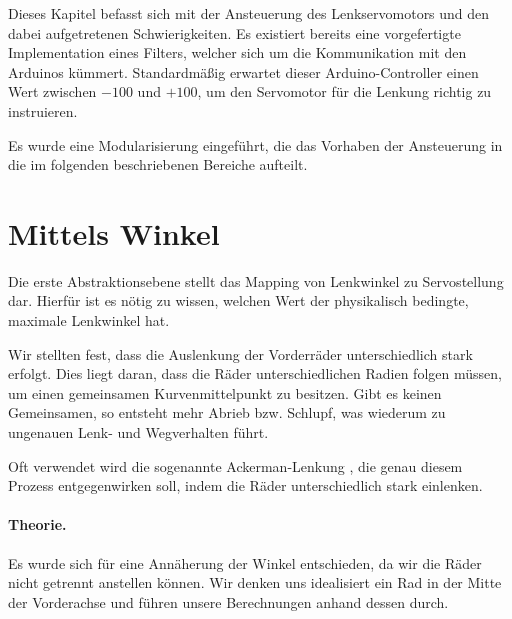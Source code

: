 \documentclass[a4paper,12pt]{report}
\begin{document}
	Dieses Kapitel befasst sich mit der Ansteuerung des Lenkservomotors und den dabei aufgetretenen Schwierigkeiten.
	Es existiert bereits eine vorgefertigte Implementation eines Filters, welcher sich um die Kommunikation mit den Arduinos kümmert.
	Standardmäßig erwartet dieser Arduino-Controller einen Wert zwischen $-100$ und $+100$, um den Servomotor für die Lenkung richtig zu instruieren.

	Es wurde eine Modularisierung eingeführt, die das Vorhaben der Ansteuerung in die im folgenden beschriebenen Bereiche aufteilt.

\section{Mittels Winkel}
\label{Steering-Angle-To-Servo}

	Die erste Abstraktionsebene stellt das Mapping von Lenkwinkel zu Servostellung dar.
	Hierfür ist es nötig zu wissen, welchen Wert der physikalisch bedingte, maximale Lenkwinkel hat.

	Wir stellten fest, dass die Auslenkung der Vorderräder unterschiedlich stark erfolgt.
	Dies liegt daran, dass die Räder unterschiedlichen Radien folgen müssen, um einen gemeinsamen Kurvenmittelpunkt zu besitzen.
	Gibt es keinen Gemeinsamen, so entsteht mehr Abrieb bzw. Schlupf, was wiederum zu ungenauen Lenk- und Wegverhalten führt.

	Oft verwendet wird die sogenannte Ackerman-Lenkung \cite{berry16}, die genau diesem Prozess entgegenwirken soll, indem die Räder unterschiedlich stark einlenken.

	\paragraph{Theorie.}
	Es wurde sich für eine Annäherung der Winkel entschieden, da wir die Räder nicht getrennt anstellen können.
	Wir denken uns idealisiert ein Rad in der Mitte der Vorderachse und führen unsere Berechnungen anhand dessen durch.
\end{document}

